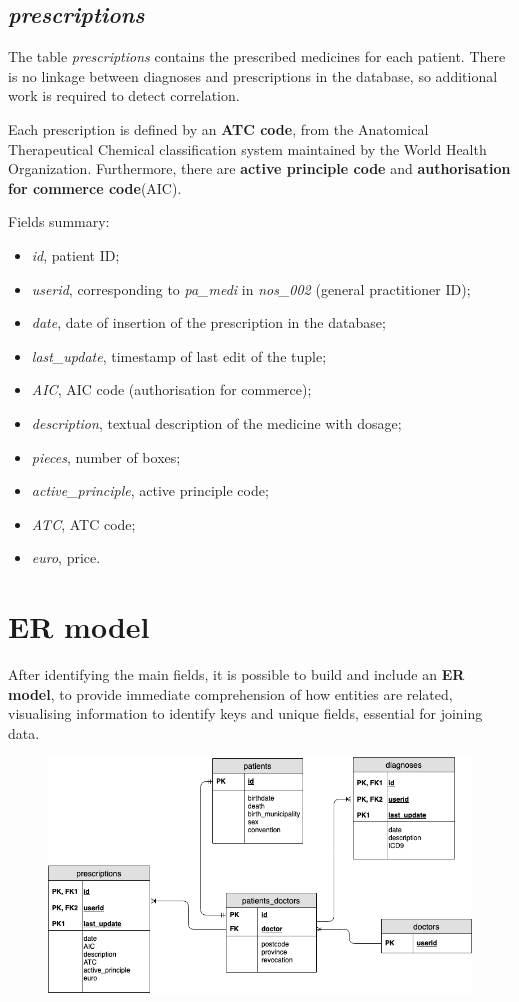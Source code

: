 \subsection{\textit{prescriptions}}
The table \textit{prescriptions} contains the prescribed medicines for each patient. There is no linkage between diagnoses and prescriptions in the database, so additional work is required to detect correlation.

Each prescription is defined by an \textbf{ATC code}, from the Anatomical Therapeutical Chemical classification system maintained by the World Health Organization. Furthermore, there are \textbf{active principle code} and \textbf{authorisation for commerce code}(AIC).

Fields summary:
\begin{itemize}
	\item \textit{id}, patient ID;
	\item \textit{userid}, corresponding to \textit{pa\_medi }in \textit{nos\_002} (general practitioner ID);
	\item \textit{date}, date of insertion of the prescription in the database;
	\item \textit{last\_update}, timestamp of last edit of the tuple;
	\item \textit{AIC}, AIC code (authorisation for commerce);
	\item \textit{description}, textual description of the medicine with dosage;
	\item \textit{pieces}, number of boxes;
	\item \textit{active\_principle}, active principle code;
	\item \textit{ATC}, ATC code;
	\item \textit{euro}, price.
\end{itemize}

\section{ER model}
After identifying the main fields, it is possible to build and include an \textbf{ER model}\cite{draw}, to provide immediate comprehension of how entities are related, visualising information to identify keys and unique fields, essential for joining data.
\smallskip
\begin{figure}[h]
	\centering
	\includegraphics[scale=0.58]{images/er.png}
\end{figure}

